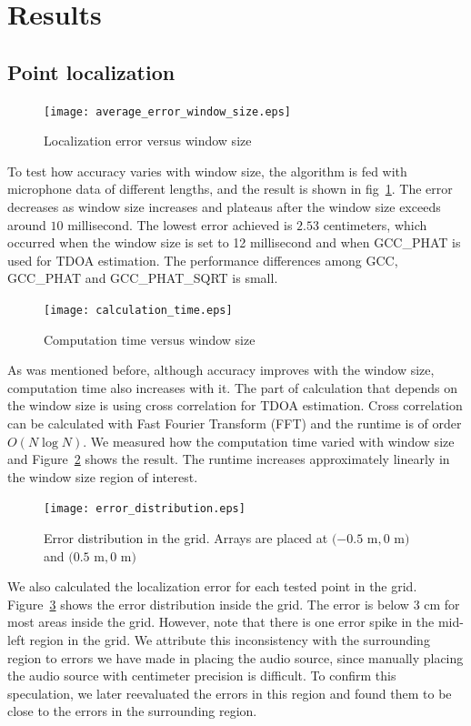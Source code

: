 \section{Results}
\subsection{Point localization}
\begin{figure}[h!]
\centering
\texttt{[image: average\_error\_window\_size.eps]}
\caption{Localization error versus window size}
\label{fig:accuracy_vs_window}
\end{figure}
To test how accuracy varies with window size, the algorithm is fed with microphone data of different lengths, and the result is shown in fig~\ref{fig:accuracy_vs_window}. The error decreases as window size increases and plateaus after the window size exceeds around $10$ millisecond. The lowest error achieved is $2.53$ centimeters, which occurred when the window size is set to 12 millisecond and when GCC\_PHAT is used for TDOA estimation. The performance differences among GCC, GCC\_PHAT and GCC\_PHAT\_SQRT is small.

\begin{figure}[h!]
\centering
\texttt{[image: calculation\_time.eps]}
\caption{Computation time versus window size}
\label{fig:speed_vs_window}
\end{figure}
As was mentioned before, although accuracy improves with the window size, computation time also increases with it. The part of calculation that depends on the window size is using cross correlation for TDOA estimation. Cross correlation can be calculated with Fast Fourier Transform (FFT) and the runtime is of order $O(N\log N)$. We measured how the computation time varied with window size and Figure~\ref{fig:speed_vs_window} shows the result. The runtime increases approximately linearly in the window size region of interest.

\begin{figure}[h!]
\centering
\texttt{[image: error\_distribution.eps]}
\caption{Error distribution in the grid. Arrays are placed at $(-0.5$ m$, 0$ m$)$ and $(0.5$ m$, 0$ m$)$}
\label{fig:error_distribution}
\end{figure}
We also calculated the localization error for each tested point in the grid. Figure~\ref{fig:error_distribution} shows the error distribution inside the grid. The error is below $3$ cm for most areas inside the grid. However, note that there is one error spike in the mid-left region in the grid. We attribute this inconsistency with the surrounding region to errors we have made in placing the audio source, since manually placing the audio source with centimeter precision is difficult. To confirm this speculation, we later reevaluated the errors in this region and found them to be close to the errors in the surrounding region. 


